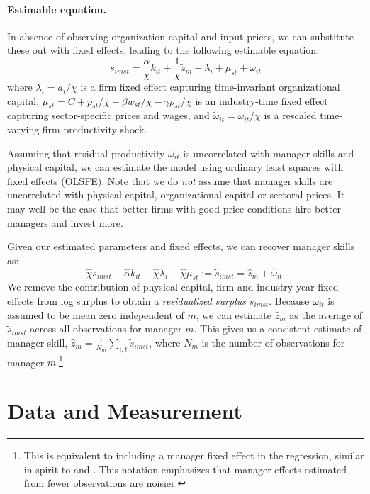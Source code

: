 \documentclass[11pt,a4paper]{article}
\begin{document}
\paragraph{Estimable equation.} In absence of observing organization capital and input prices, we can substitute these out with fixed effects, leading to the following estimable equation:
\begin{equation}\label{eq:estimation}
s_{imst} = \frac\alpha\chi k_{it}  + \frac1\chi\tilde{z}_m + \lambda_i + \mu_{st} + \tilde \omega_{it}
\end{equation}
where $\lambda_i = a_i/\chi$ is a firm fixed effect capturing time-invariant organizational capital, $\mu_{st} = C + p_{st}/\chi - \beta w_{st}/\chi - \gamma\rho_{st}/\chi$ is an industry-time fixed effect capturing sector-specific prices and wages, and $\tilde\omega_{it} = \omega_{it}/\chi$ is a rescaled time-varying firm productivity shock. 

Assuming that residual productivity $\tilde\omega_{it}$ is uncorrelated with manager skills and physical capital, we can estimate the model using ordinary least squares with fixed effects (OLSFE). Note that we do \emph{not} assume that manager skills are uncorrelated with physical capital, organizational capital or sectoral prices. It may well be the case that better firms with good price conditions hire better managers and invest more. 

Given our estimated parameters and fixed effects, we can recover manager skills as:
\begin{equation}\label{eq:estimated}
\hat\chi s_{imst} -  \hat\alpha k_{it}  -\hat\chi \lambda_i -\hat\chi \mu_{st} := \tilde s_{imst} = \hat z_m + \hat\omega_{it}. 
\end{equation}
We remove the contribution of physical capital, firm and industry-year fixed effects from log surplus to obtain a \emph{residualized surplus} $\tilde s_{imst}$. Because $\omega_{it}$ is assumed to be mean zero independent of $m$, we can estimate $\hat z_m$ as the average of $\tilde s_{imst}$ across all observations for manager $m$. This gives us a consistent estimate of manager skill, $\hat z_m = \frac1{N_m}\sum_{i,t} \tilde s_{imst}$, where $N_m$ is the number of observations for manager $m$.\footnote{This is equivalent to including a manager fixed effect in the regression, similar in spirit to \citet{Abowd1999Econometrica} and \citet{Card2018JoLE}. This notation emphasizes that manager effects estimated from fewer observations are noisier.}

\section{Data and Measurement}
\end{document}
